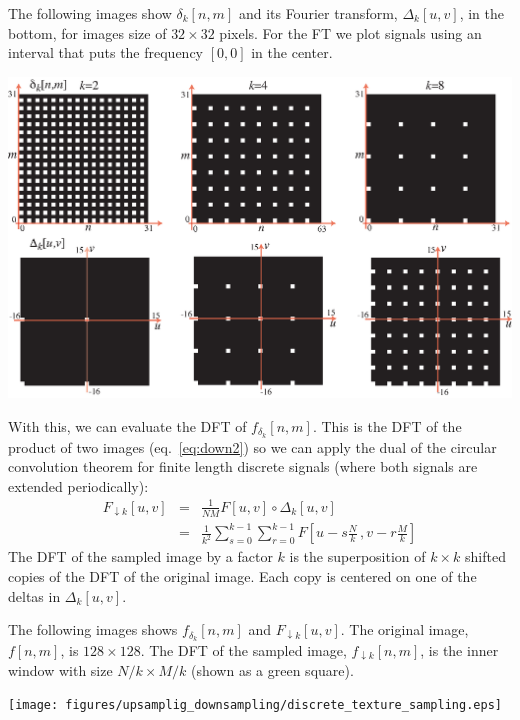 The following images show $\delta_k \left[n,m\right]$ and its Fourier transform, $\Delta_k \left[u,v\right]$, in the bottom, for images size of $32 \times 32$ pixels. For the FT we  plot signals using an interval that puts the frequency $[0,0]$ in the center. 

\begin{center}
\includegraphics[width=1\linewidth]{figures/upsamplig_downsampling/discrete_delta_train.eps}
\end{center}


With this, we can evaluate the DFT of $f_{\delta_k} \left[n,m\right]$. This is the DFT of the product of two images (eq.~\ref{eq:down2}) so we can apply the dual of the circular convolution theorem for finite length discrete signals (where both signals are extended periodically):
\begin{eqnarray}
F_{\downarrow k} \left[u,v\right] &=& \frac{1}{NM} F \left[u,v\right] \circ \Delta_k \left[u,v\right] \\ \nonumber
&=& \frac{1}{k^2} \sum_{s=0}^{k-1} \sum_{r=0}^{k-1} F \left[u - s\frac{N}{k} \, ,v - r\frac{M}{k} \right]
\end{eqnarray}
The DFT of the sampled image by a factor $k$ is the superposition of $k \times k$ shifted copies of the DFT of the original image. Each copy is centered on one of the deltas in $\Delta_k \left[u,v\right]$.

The following images shows $f_{\delta_k} \left[n,m\right]$ and $F_{\downarrow k} \left[u,v\right]$. The original image, $f \left[n,m\right]$, is $128 \times 128$. The DFT of the sampled image, $f_{\downarrow k} \left[n,m\right]$, is the inner window with size $N/k \times M/k$ (shown as a green square).

\begin{center}
\texttt{[image: figures/upsamplig\_downsampling/discrete\_texture\_sampling.eps]}
\end{center}

